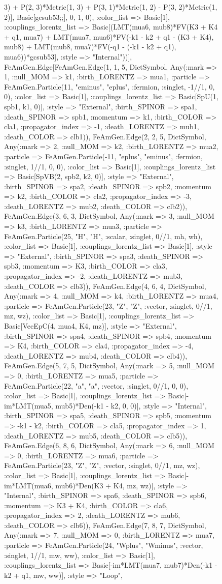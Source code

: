 \documentclass{revtex4}
\begin{document}
\begin{figure}[!htb]
\begin{center}
{3) + P(2, 3)*Metric(1, 3) + P(3, 1)*Metric(1, 2) - P(3, 2)*Metric(1, 2)], Basic[gcsub53;;], 0, 1, 0), :color_list => Basic[1], :couplings_lorentz_list => Basic[(LMT(mua6, mub8)*FV(K3 + K4 + q1, mua7) + LMT(mua7, mua6)*FV(-k1 - k2 + q1 - (K3 + K4), mub8) + LMT(mub8, mua7)*FV(-q1 - (-k1 - k2 + q1), mua6))*gcsub53], :style => "Internal"))], FeAmGen.Edge[FeAmGen.Edge(1, 1, 5, Dict{Symbol, Any}(:mark => 1, :null_MOM => k1, :birth_LORENTZ => mua1, :particle => FeAmGen.Particle(11, "eminus", "eplus", :fermion, :singlet, -1//1, 0, 0), :color_list => Basic[1], :couplings_lorentz_list => Basic[SpU(1, spb1, k1, 0)], :style => "External", :birth_SPINOR => spa1, :death_SPINOR => spb1, :momentum => k1, :birth_COLOR => cla1, :propagator_index => -1, :death_LORENTZ => mub1, :death_COLOR => clb1)), FeAmGen.Edge(2, 2, 5, Dict{Symbol, Any}(:mark => 2, :null_MOM => k2, :birth_LORENTZ => mua2, :particle => FeAmGen.Particle(-11, "eplus", "eminus", :fermion, :singlet, 1//1, 0, 0), :color_list => Basic[1], :couplings_lorentz_list => Basic[SpVB(2, spb2, k2, 0)], :style => "External", :birth_SPINOR => spa2, :death_SPINOR => spb2, :momentum => k2, :birth_COLOR => cla2, :propagator_index => -3, :death_LORENTZ => mub2, :death_COLOR => clb2)), FeAmGen.Edge(3, 6, 3, Dict{Symbol, Any}(:mark => 3, :null_MOM => k3, :birth_LORENTZ => mua3, :particle => FeAmGen.Particle(25, "H", "H", :scalar, :singlet, 0//1, mh, wh), :color_list => Basic[1], :couplings_lorentz_list => Basic[1], :style => "External", :birth_SPINOR => spa3, :death_SPINOR => spb3, :momentum => K3, :birth_COLOR => cla3, :propagator_index => -2, :death_LORENTZ => mub3, :death_COLOR => clb3)), FeAmGen.Edge(4, 6, 4, Dict{Symbol, Any}(:mark => 4, :null_MOM => k4, :birth_LORENTZ => mua4, :particle => FeAmGen.Particle(23, "Z", "Z", :vector, :singlet, 0//1, mz, wz), :color_list => Basic[1], :couplings_lorentz_list => Basic[VecEpC(4, mua4, K4, mz)], :style => "External", :birth_SPINOR => spa4, :death_SPINOR => spb4, :momentum => K4, :birth_COLOR => cla4, :propagator_index => -4, :death_LORENTZ => mub4, :death_COLOR => clb4)), FeAmGen.Edge(5, 7, 5, Dict{Symbol, Any}(:mark => 5, :null_MOM => 0, :birth_LORENTZ => mua5, :particle => FeAmGen.Particle(22, "a", "a", :vector, :singlet, 0//1, 0, 0), :color_list => Basic[1], :couplings_lorentz_list => Basic[-im*LMT(mua5, mub5)*Den(-k1 - k2, 0, 0)], :style => "Internal", :birth_SPINOR => spa5, :death_SPINOR => spb5, :momentum => -k1 - k2, :birth_COLOR => cla5, :propagator_index => 1, :death_LORENTZ => mub5, :death_COLOR => clb5)), FeAmGen.Edge(6, 8, 6, Dict{Symbol, Any}(:mark => 6, :null_MOM => 0, :birth_LORENTZ => mua6, :particle => FeAmGen.Particle(23, "Z", "Z", :vector, :singlet, 0//1, mz, wz), :color_list => Basic[1], :couplings_lorentz_list => Basic[-im*LMT(mua6, mub6)*Den(K3 + K4, mz, wz)], :style => "Internal", :birth_SPINOR => spa6, :death_SPINOR => spb6, :momentum => K3 + K4, :birth_COLOR => cla6, :propagator_index => 2, :death_LORENTZ => mub6, :death_COLOR => clb6)), FeAmGen.Edge(7, 8, 7, Dict{Symbol, Any}(:mark => 7, :null_MOM => 0, :birth_LORENTZ => mua7, :particle => FeAmGen.Particle(24, "Wplus", "Wminus", :vector, :singlet, 1//1, mw, ww), :color_list => Basic[1], :couplings_lorentz_list => Basic[-im*LMT(mua7, mub7)*Den(-k1 - k2 + q1, mw, ww)], :style => "Loop", }
\end{center}
\end{figure}
\end{document}
